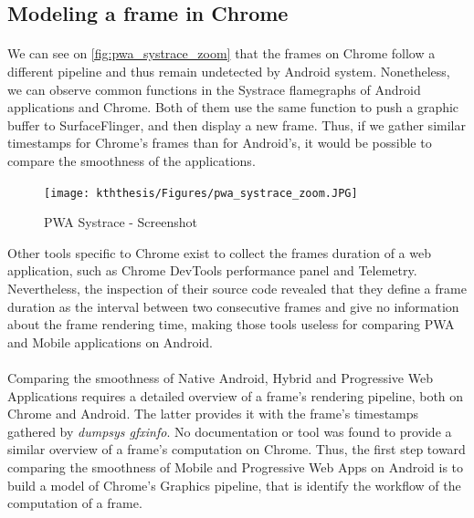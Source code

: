     \subsection{Modeling a frame in Chrome}
    
    \paragraph{}
    We can see on \autoref{fig:pwa_systrace_zoom} that the frames on Chrome follow a different pipeline and thus remain undetected by Android system. Nonetheless, we can observe common functions in the Systrace flamegraphs of Android applications and Chrome. Both of them use the same function to push a graphic buffer to SurfaceFlinger, and then display a new frame. Thus, if we gather similar timestamps for Chrome's frames than for Android's, it would be possible to compare the smoothness of the applications.
    
    
    
    \begin{figure}[h]
        \centering
        \texttt{[image: kththesis/Figures/pwa\_systrace\_zoom.JPG]}
        \caption{PWA Systrace - Screenshot}
        \label{fig:pwa_systrace_zoom}
    \end{figure}
    
    Other tools specific to Chrome exist to collect the frames duration of a web application, such as Chrome DevTools performance panel and Telemetry. Nevertheless, the inspection of their source code revealed that they define a frame duration as the interval between two consecutive frames and give no information about the frame rendering time, making those tools useless for comparing PWA and Mobile applications on Android.
    
    \paragraph{}
    Comparing the smoothness of Native Android, Hybrid and Progressive Web Applications requires a detailed overview of a frame's rendering pipeline, both on Chrome and Android. The latter provides it with the frame's timestamps gathered by \textit{dumpsys gfxinfo}. No documentation or tool was found to provide a similar overview of a frame's computation on Chrome. Thus, the first step toward comparing the smoothness of Mobile and Progressive Web Apps on Android is to build a model of Chrome's Graphics pipeline, that is identify the workflow of the computation of a frame. 
    
